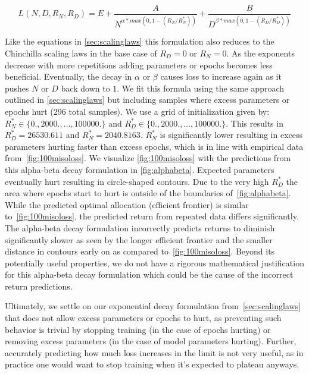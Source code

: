 \documentclass{article}
\begin{document}
\begin{equation}
\label{eq:alphabeta}
L(N,D,R_N,R_D)=E + \frac{A}{N^{\alpha * max(0, 1 - (R_N/R_N^*))}} + \frac{B}{D^{\beta * max(0, 1 - (R_D/R_D^*))}}
\end{equation}

Like the equations in \autoref{sec:scalinglaws} this formulation also reduces to the Chinchilla scaling laws in the base case of $R_D=0$ or $R_N=0$. As the exponents decrease with more repetitions adding parameters or epochs becomes less beneficial. Eventually, the decay in $\alpha$ or $\beta$ causes loss to increase again as it pushes $N$ or $D$ back down to $1$. We fit this formula using the same approach outlined in \autoref{sec:scalinglaws} but including samples where excess parameters or epochs hurt (296 total samples). We use a grid of initialization given by: $R_N^* \in \{0., 2000.,\dots, 100000. \}$ and $R_D^* \in \{0., 2000.,\dots, 100000. \}$. This results in $R_D^*=26530.611$ and $R_N^*=2040.8163$. $R_N^*$ is significantly lower resulting in excess parameters hurting faster than excess epochs, which is in line with empirical data from~\autoref{fig:100misoloss}. We visualize \autoref{fig:100misoloss} with the predictions from this alpha-beta decay formulation in \autoref{fig:alphabeta}. Expected parameters eventually hurt resulting in circle-shaped contours. Due to the very high $R_D^*$ the area where epochs start to hurt is outside of the boundaries of~\autoref{fig:alphabeta}. While the predicted optimal allocation (efficient frontier) is similar to~\autoref{fig:100misoloss}, the predicted return from repeated data differs significantly. The alpha-beta decay formulation incorrectly predicts returns to diminish significantly slower as seen by the longer efficient frontier and the smaller distance in contours early on as compared to~\autoref{fig:100misoloss}. Beyond its potentially useful properties, we do not have a rigorous mathematical justification for this alpha-beta decay formulation which could be the cause of the incorrect return predictions.

Ultimately, we settle on our exponential decay formulation from~\autoref{sec:scalinglaws} that does not allow excess parameters or epochs to hurt, as preventing such behavior is trivial by stopping training (in the case of epochs hurting) or removing excess parameters (in the case of model parameters hurting). Further, accurately predicting how much loss increases in the limit is not very useful, as in practice one would want to stop training when it's expected to plateau anyways.
\end{document}
